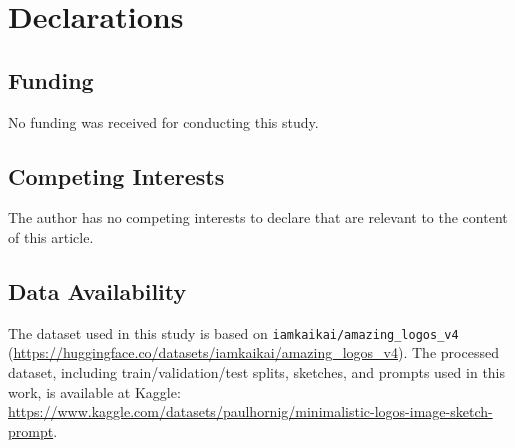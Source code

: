 
\section*{Declarations}

\subsection*{Funding}
No funding was received for conducting this study.


\subsection*{Competing Interests}
The author has no competing interests to declare that are relevant to the content of this article.


\subsection*{Data Availability}
\begin{sloppypar}
The dataset used in this study is based on \texttt{iamkaikai/amazing\_logos\_v4} (\url{https://huggingface.co/datasets/iamkaikai/amazing_logos_v4}). The processed dataset, including train/validation/test splits, sketches, and prompts used in this work, is available at Kaggle: \url{https://www.kaggle.com/datasets/paulhornig/minimalistic-logos-image-sketch-prompt}.
\end{sloppypar}

